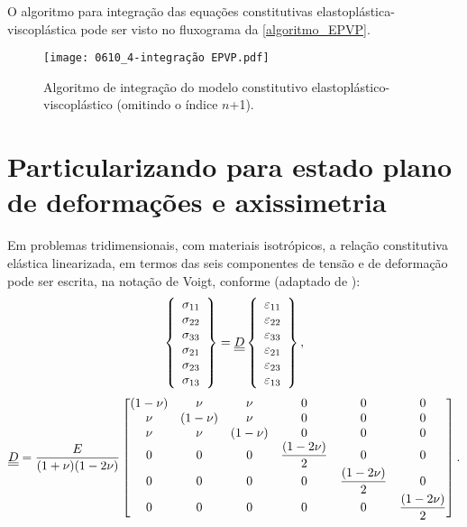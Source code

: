 O algoritmo para integração das equações constitutivas elastoplástica-viscoplástica pode ser visto no fluxograma da \autoref{algoritmo_EPVP}.
\begin{figure}[H]
	\begin{center}
		\texttt{[image: 0610\_4-integração EPVP.pdf]}
	\end{center}
	\caption{\label{algoritmo_EPVP}Algoritmo de integração do modelo constitutivo elastoplástico-viscoplástico (omitindo o índice $n$+1).}
\end{figure}

\section{Particularizando para estado plano de deformações e axissimetria}
Em problemas tridimensionais, com materiais isotrópicos, a relação constitutiva elástica linearizada, em termos das seis componentes de tensão e de deformação pode ser escrita, na notação de Voigt, conforme (adaptado de ):
\begin{equation}
	\label{eq:Dl}
	\left\{\begin{array}{lcl}
		\sigma_{11} \\
		\sigma_{22} \\
		\sigma_{33} \\
		\sigma_{21} \\
		\sigma_{23} \\
		\sigma_{13} 
	\end{array}\right\} = 
	\underline{\underline D}
	\left\{\begin{array}{lcl}
	\varepsilon_{11} \\
	\varepsilon_{22} \\
	\varepsilon_{33} \\
	\varepsilon_{21} \\
	\varepsilon_{23} \\
	\varepsilon_{13} 
\end{array}\right\},
\end{equation}
\begin{equation}
	\underline{\underline D} = 
	\dfrac{E}{(1+\nu)(1-2\nu)} 
	\begin{bmatrix}
	(1-\nu)	& \nu 		& \nu  		& 0	 		& 0 			& 0 \\
	\nu 	& (1-\nu)	& \nu  		& 0		 	& 0				& 0  \\
	\nu 	& \nu 		& (1-\nu)   & 0		 	& 0 			& 0  \\
	0		& 0			& 0		    & \dfrac{(1-2\nu)}{2} & 0 			& 0  \\
	0		& 0			& 0		    & 0	       	& \dfrac{(1-2\nu)}{2}	& 0  \\
	0		& 0			& 0		    & 0	       	& 0         	& \dfrac{(1-2\nu)}{2}
	\end{bmatrix}.
\end{equation}

